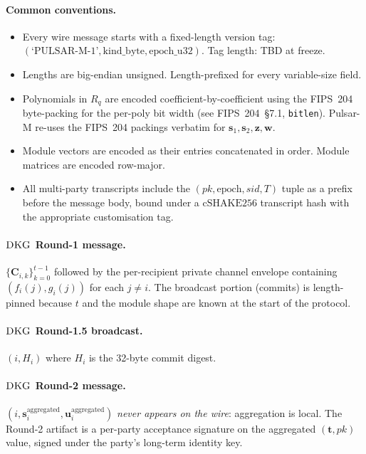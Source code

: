 \documentclass[11pt,a4paper]{article}
\theoremstyle{definition}
\theoremstyle{remark}
\newcommand{\Rq}{R_q}
\newcommand{\cSHAKE}{\mathrm{cSHAKE256}}
\newcommand{\DKG}{\textsc{DKG}}
\begin{document}
\paragraph{Common conventions.}
\begin{itemize}[leftmargin=*, itemsep=0pt]
\item Every wire message starts with a fixed-length version tag:
$(\text{`PULSAR-M-1'}, \text{kind\_byte}, \text{epoch\_u32})$.
Tag length: TBD at freeze.
\item Lengths are big-endian unsigned. Length-prefixed for every
variable-size field.
\item Polynomials in $\Rq$ are encoded coefficient-by-coefficient
using the FIPS~204 byte-packing for the per-poly bit width (see
FIPS~204~\S7.1, \texttt{bitlen}). Pulsar-M re-uses the FIPS~204
packings verbatim for $\mathbf{s}_1, \mathbf{s}_2, \mathbf{z}, \mathbf{w}$.
\item Module vectors are encoded as their entries concatenated in
order. Module matrices are encoded row-major.
\item All multi-party transcripts include the
$(\mathit{pk}, \text{epoch}, \mathit{sid}, T)$ tuple as a
prefix before the message body, bound under a $\cSHAKE$ transcript
hash with the appropriate customisation tag.
\end{itemize}

\paragraph{$\DKG$ Round-1 message.}
\(\{\mathbf{C}_{i,k}\}_{k=0}^{t-1}\) followed by the per-recipient
private channel envelope containing $(f_i(j), g_i(j))$ for each
$j \ne i$. The broadcast portion (commits) is length-pinned because
$t$ and the module shape are known at the start of the protocol.

\paragraph{$\DKG$ Round-1.5 broadcast.}
$(i, H_i)$ where $H_i$ is the 32-byte commit digest.

\paragraph{$\DKG$ Round-2 message.}
$(i, \mathbf{s}_i^{\mathrm{aggregated}}, \mathbf{u}_i^{\mathrm{aggregated}})$
\emph{never appears on the wire}: aggregation is local. The Round-2
artifact is a per-party acceptance signature on the aggregated
$(\mathbf{t}, \mathit{pk})$ value, signed under the party's long-term
identity key.
\end{document}
